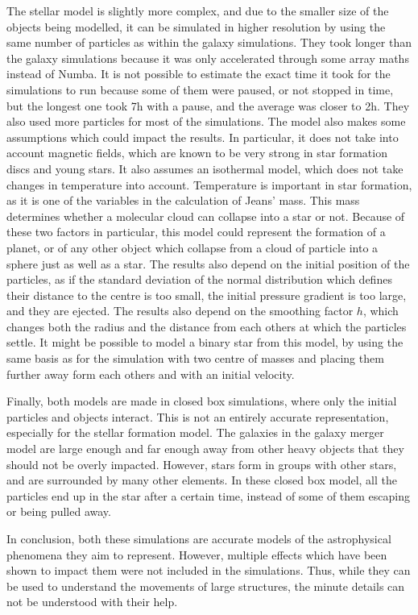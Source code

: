 \documentclass[a4paper,12pt]{article}
\begin{document}
The stellar model is slightly more complex, and due to the smaller size of the objects being modelled, it can be simulated in higher resolution by using the same number of particles as within the galaxy simulations. They took longer than the galaxy simulations because it was only accelerated through some array maths instead of Numba. It is not possible to estimate the exact time it took for the simulations to run because some of them were paused, or not stopped in time, but the longest one took 7h with a pause, and the average was closer to 2h. They also used more particles for most of the simulations. The model also makes some assumptions which could impact the results. In particular, it does not take into account magnetic fields, which are known to be very strong in star formation discs and young stars. It also assumes an isothermal model, which does not take changes in temperature into account. Temperature is important in star formation, as it is one of the variables in the calculation of Jeans' mass. This mass determines whether a molecular cloud can collapse into a star or not. Because of these two factors in particular, this model could represent the formation of a planet, or of any other object which collapse from a cloud of particle into a sphere just as well as a star. The results also depend on the initial position of the particles, as if the standard deviation of the normal distribution which defines their distance to the centre is too small, the initial pressure gradient is too large, and they are ejected. The results also depend on the smoothing factor $h$, which changes both the radius and the distance from each others at which the particles settle. It might be possible to model a binary star from this model, by using the same basis as for the simulation with two centre of masses and placing them further away form each others and with an initial velocity.


Finally, both models are made in closed box simulations, where only the initial particles and objects interact. This is not an entirely accurate representation, especially for the stellar formation model. The galaxies in the galaxy merger model are large enough and far enough away from other heavy objects that they should not be overly impacted. However, stars form in groups with other stars, and are surrounded by many other elements. In these closed box model, all the particles end up in the star after a certain time, instead of some of them escaping or being pulled away.


In conclusion, both these simulations are accurate models of the astrophysical phenomena they aim to represent. However, multiple effects which have been shown to impact them were not included in the simulations. Thus, while they can be used to understand the movements of large structures, the minute details can not be understood with their help.\newline
\end{document}
